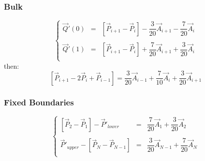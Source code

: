 \documentclass[aps,12pt]{revtex4}
\begin{document}
\subsubsection{Bulk}

\begin{equation}
\left\lbrace
\begin{array}{rcl}
	\vec{Q}'(0) & = & \left[\vec{P}_{i+1}-\vec{P}_i\right] - \dfrac{3}{20} \vec{A}_{i+1} - \dfrac{7}{20}\vec{A}_{i} \\
	\\
	\vec{Q}'(1) & = & \left[\vec{P}_{i+1}-\vec{P}_i\right] + \dfrac{7}{20} \vec{A}_{i+1} + \dfrac{3}{20}\vec{A}_{i}\\
\end{array}
\right.
\end{equation}
then:
\begin{equation}
	 \left[\vec{P}_{i+1}-2\vec{P}_i+\vec{P}_{i-1}\right] = \dfrac{3}{20} \vec{A}_{i-1} + \dfrac{7}{10}\vec{A}_{i} + \dfrac{3}{20} \vec{A}_{i+1}
\end{equation}

\subsubsection{Fixed Boundaries}
 
\begin{equation}
\left\lbrace
\begin{array}{rcl}
 	 \left[\vec{P}_{2}-\vec{P}_1\right] - \vec{P}'_{lower}& = &\dfrac{7}{20} \vec{A}_1 + \dfrac{3}{20} \vec{A}_{2}\\
	 \\
	\vec{P}'_{upper} - \left[\vec{P}_N - \vec{P}_{N-1}\right] & = & \dfrac{3}{20} \vec{A}_{N-1} + \dfrac{7}{20} \vec{A}_{N}\\
\end{array}
\right.
\end{equation}
\end{document}
